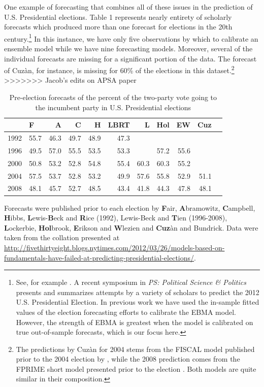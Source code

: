 \documentclass[12pt,fullpage,endnotes]{article}
\begin{document}
One example of forecasting that combines all of these issues in the
prediction of U.S. Presidential elections.  Table 1 represents nearly
entirety of scholarly forecasts which produced more than one forecast
for elections in the 20th century.\footnote{ See, for example
  \citet[][]{Fair:2009, Fair2011, Abramowitz:2008, Campbell:2008,
    hibbs:2012, Lockerbie:2008, Erikson:Wlezien:2008, Graefe:2010,
    Holbrook:2008}.  A recent symposium in {\em PS: Political Science
    \& Politics} presents and summarizes attempts by a variety of
  scholars to predict the 2012 U.S. Presidential Election. In previous
  work \citep{mhw:2012} we have used the in-sample fitted values of
  the election forecasting efforts to calibrate the EBMA
  model. However, the strength of EBMA is greatest when the model is
  calibrated on true out-of-sample forecasts, which is our focus
  here.}  In this instance, we have only five observations by which to
calibrate an ensemble model while we have nine forecasting models.
Moreover, several of the individual forecasts are missing for a
significant portion of the data.  The forecast of Cuz\`an, for
instance, is missing for 60\% of the elections in this
dataset.\footnote{The predictions by Cuz\`an for 2004 stems from the
  FISCAL model published prior to the 2004 election by
  \citet{Cuzan:2004}, while the 2008 prediction comes from the FPRIME
  short model presented prior to the election
  \citep{Cuzan:Bundrick:2008}.  Both models are quite similar in their
  composition.}
>>>>>>> Jacob's edits on APSA paper

\begin{table}[ht]
\caption{Pre-election forecasts of the percent of the two-party vote going to the incumbent party in U.S. Presidential elections}
\label{tab:one}
\footnotesize
\begin{center}
\begin{tabular}{rlrrrrrrrrr}
  \toprule
  & F & A & C & H & LBRT & L & Hol & EW & Cuz \\ 
  \midrule
  1992 & 55.7 & 46.3 & 49.7 & 48.9 & 47.3 &  &  &  &  \\ 
  1996 & 49.5 & 57.0 & 55.5 & 53.5 & 53.3 &  & 57.2 & 55.6 &  \\ 
  2000 & 50.8 & 53.2 & 52.8 & 54.8 & 55.4 & 60.3 & 60.3 & 55.2 &  \\ 
  2004 & 57.5 & 53.7 & 52.8 & 53.2 & 49.9 & 57.6 & 55.8 & 52.9 & 51.1 \\ 
  2008 & 48.1 & 45.7 & 52.7 & 48.5 & 43.4 & 41.8 & 44.3 & 47.8 & 48.1 \\ 
  \bottomrule

\end{tabular}
\end{center}
Forecasts were published prior to each election by \textbf{F}air, \textbf{A}bramowitz, \textbf{C}ampbell, \textbf{H}ibbs, \textbf{L}ewis-\textbf{B}eck and \textbf{R}ice (1992), Lewis-Beck and \textbf{T}ien  (1996-2008),   \textbf{L}ockerbie, \textbf{Hol}brook, \textbf{E}rikson and \textbf{W}lezien and \textbf{Cuz}\`an and Bundrick.  Data were taken from the collation presented at \url{http://fivethirtyeight.blogs.nytimes.com/2012/03/26/models-based-on-fundamentals-have-failed-at-predicting-presidential-elections/}.
\end{table}
\end{document}
